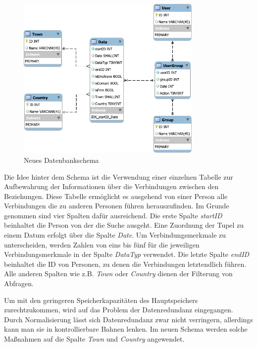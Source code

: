 \begin{figure}[htbp]
\centering
  \includegraphics[width=0.8\textwidth, width=0.8\textwidth]{pics/NewSchema.pdf}
\caption{Neues Datenbankschema}
\label{konzept_SchemaNeu}
\end{figure} 

Die Idee hinter dem Schema ist die Verwendung einer einzelnen Tabelle zur Aufbewahrung der Informationen über die Verbindungen zwischen den Beziehungen. Diese Tabelle ermöglicht es ausgehend von einer Person alle Verbindungen die zu anderen Personen führen herauszufinden. Im Grunde genommen sind vier Spalten dafür ausreichend. Die erste Spalte \textit{startID} beinhaltet die Person von der die Suche ausgeht. Eine Zuordnung der Tupel zu einem Datum erfolgt über die Spalte \textit{Date}. Um Verbindungsmerkmale zu unterscheiden, werden Zahlen von eins bis fünf für die jeweiligen Verbindungsmerkmale in der Spalte \textit{DataTyp} verwendet. Die letzte Spalte \textit{endID} beinhaltet die ID von Personen, zu denen die Verbindungen letztendlich führen. Alle anderen Spalten wie z.B. \textit{Town} oder \textit{Country} dienen der Filterung von Abfragen.

Um mit den geringeren Speicherkapazitäten des Hauptspeichers zurechtzukommen, wird auf das Problem der Datenredundanz eingegangen. Durch Normalisierung lässt sich Datenredundanz zwar nicht verringern, allerdings kann man sie in kontrollierbare Bahnen lenken. Im neuen Schema werden solche Maßnahmen auf die Spalte \textit{Town} und \textit{Country} angewendet. 

